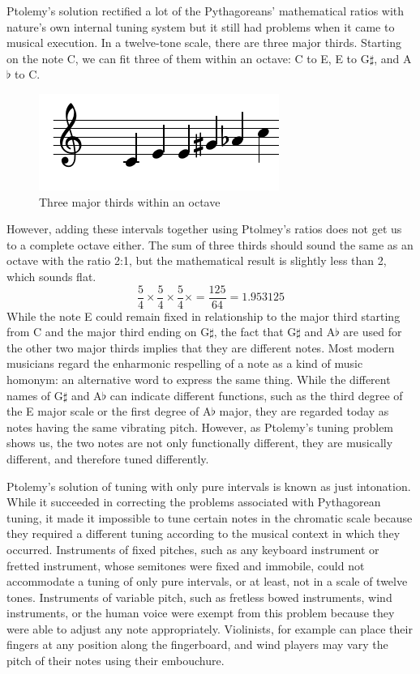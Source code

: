 Ptolemy's solution rectified a lot of the Pythagoreans' mathematical ratios with nature's
own internal tuning system but it still had problems when it came to musical execution.
In a twelve-tone scale, there are three major thirds. Starting on the note C, we can fit
three of them within an octave: C to E, E to G$\sharp$, and A$\flat$ to C.
\begin{figure}[h]
\centering
\includegraphics{examples/thirds.pdf}
\caption{Three major thirds within an octave}
\end{figure}
However, adding these intervals together using Ptolmey's ratios does not get us to a
complete octave either. The sum of three thirds should sound the same as an octave with
the ratio 2:1, but the mathematical result is slightly less than 2, which sounds flat.
\begin{equation}
  \frac{5}{4} \times
  \frac{5}{4} \times
  \frac{5}{4} \times = \frac{125}{64} = 1.953125
\end{equation}
While the note E could remain fixed in relationship to the major third starting from C and
the major third ending on G$\sharp$, the fact that G$\sharp$ and A$\flat$ are used for the other
two major thirds implies that they are different notes. Most modern musicians regard the
enharmonic respelling of a note as a kind of music homonym: an alternative word to express
the same thing. While the different names of G$\sharp$ and A$\flat$ can indicate different
functions, such as the third degree of the E major scale or the first degree of A$\flat$
major, they are regarded today as notes having the same vibrating pitch. However, as
Ptolemy's tuning problem shows us, the two notes are not only functionally different, they
are musically different, and therefore tuned differently.

Ptolemy's solution of tuning with only pure intervals is known as just intonation. While it succeeded in correcting the
problems associated with Pythagorean tuning, it made it impossible to tune certain notes in the chromatic scale because
they required a different tuning according to the musical context in which they occurred. Instruments of fixed pitches,
such as any keyboard instrument or fretted instrument, whose semitones were fixed and immobile, could not accommodate a
tuning of only pure intervals, or at least, not in a scale of twelve tones. Instruments of variable pitch, such as
fretless bowed instruments, wind instruments, or the human voice were exempt from this problem because they were able to
adjust any note appropriately. Violinists, for example can place their fingers at any position along the fingerboard,
and wind players may vary the pitch of their notes using their embouchure.

